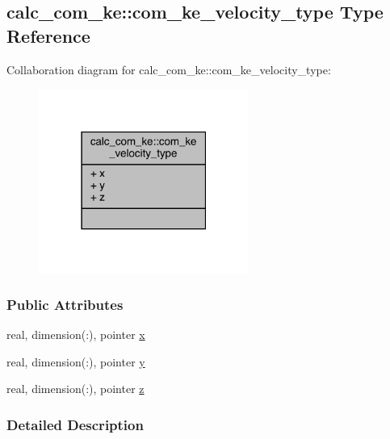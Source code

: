 \hypertarget{structcalc__com__ke_1_1com__ke__velocity__type}{\subsection{calc\-\_\-com\-\_\-ke\-:\-:com\-\_\-ke\-\_\-velocity\-\_\-type Type Reference}
\label{structcalc__com__ke_1_1com__ke__velocity__type}
}


Collaboration diagram for calc\-\_\-com\-\_\-ke\-:\-:com\-\_\-ke\-\_\-velocity\-\_\-type\-:
\nopagebreak
\begin{figure}[H]
\begin{center}
\leavevmode
\includegraphics[width=195pt]{structcalc__com__ke_1_1com__ke__velocity__type__coll__graph}
\end{center}
\end{figure}
\subsubsection*{Public Attributes}
\begin{DoxyCompactItemize}
\item 
real, dimension(\-:), pointer \hyperlink{structcalc__com__ke_1_1com__ke__velocity__type_afea9c477bf89fedf870adde30f32f435}{x}
\item 
real, dimension(\-:), pointer \hyperlink{structcalc__com__ke_1_1com__ke__velocity__type_a2a65f47e0cd0fd28fca7af8a6f16b561}{y}
\item 
real, dimension(\-:), pointer \hyperlink{structcalc__com__ke_1_1com__ke__velocity__type_ab7e84eaa33d0e2aba01ecfff683c0e4b}{z}
\end{DoxyCompactItemize}


\subsubsection{Detailed Description}


